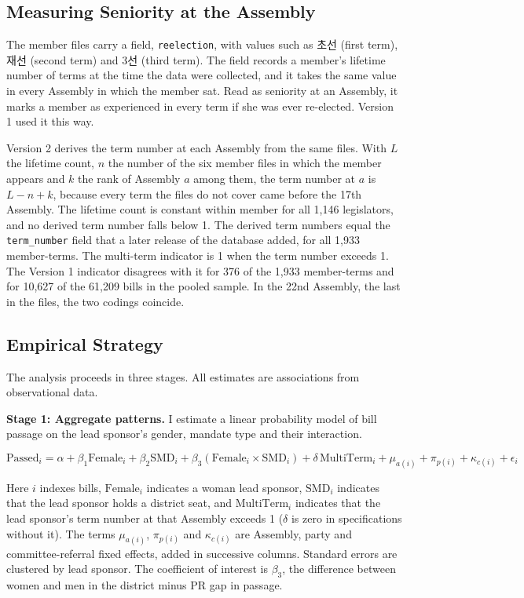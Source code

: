 \documentclass[11pt]{article}
\begin{document}
\subsection{Measuring Seniority at the Assembly}
\label{sec:seniority}

The member files carry a field, \texttt{reelection}, with values such as 초선 (first term), 재선 (second term) and 3선 (third term). The field records a member's lifetime number of terms at the time the data were collected, and it takes the same value in every Assembly in which the member sat. Read as seniority at an Assembly, it marks a member as experienced in every term if she was ever re-elected. Version 1 used it this way.

Version 2 derives the term number at each Assembly from the same files. With $L$ the lifetime count, $n$ the number of the six member files in which the member appears and $k$ the rank of Assembly $a$ among them, the term number at $a$ is $L - n + k$, because every term the files do not cover came before the 17th Assembly. The lifetime count is constant within member for all 1,146 legislators, and no derived term number falls below 1. The derived term numbers equal the \texttt{term\_number} field that a later release of the database added, for all 1,933 member-terms. The multi-term indicator is 1 when the term number exceeds 1. The Version 1 indicator disagrees with it for 376 of the 1,933 member-terms and for 10,627 of the 61,209 bills in the pooled sample. In the 22nd Assembly, the last in the files, the two codings coincide.

\subsection{Empirical Strategy}

The analysis proceeds in three stages. All estimates are associations from observational data.

\textbf{Stage 1: Aggregate patterns.} I estimate a linear probability model of bill passage on the lead sponsor's gender, mandate type and their interaction.

\begin{equation}
\text{Passed}_{i} = \alpha + \beta_1 \text{Female}_{i} + \beta_2 \text{SMD}_{i} + \beta_3 (\text{Female}_{i} \times \text{SMD}_{i}) + \delta \, \text{MultiTerm}_{i} + \mu_{a(i)} + \pi_{p(i)} + \kappa_{c(i)} + \epsilon_{i}
\label{eq:main}
\end{equation}

\noindent Here $i$ indexes bills, $\text{Female}_{i}$ indicates a woman lead sponsor, $\text{SMD}_{i}$ indicates that the lead sponsor holds a district seat, and $\text{MultiTerm}_{i}$ indicates that the lead sponsor's term number at that Assembly exceeds 1 ($\delta$ is zero in specifications without it). The terms $\mu_{a(i)}$, $\pi_{p(i)}$ and $\kappa_{c(i)}$ are Assembly, party and committee-referral fixed effects, added in successive columns. Standard errors are clustered by lead sponsor. The coefficient of interest is $\beta_3$, the difference between women and men in the district minus PR gap in passage.
\end{document}
